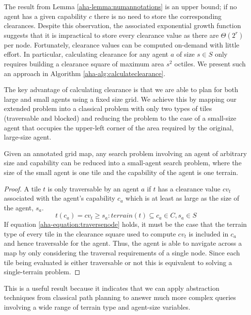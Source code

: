The result from Lemma \ref{aha-lemma:numannotations} is an upper bound; if no agent has a given capability $c$ there is no need to store the corresponding clearances.
Despite this observation, the associated exponential growth function suggests that it is impractical to store every clearance value as there are $\Theta(2^{r})$ per node.
Fortunately, clearance values can be computed on-demand with little effort. 
In particular, calculating clearance for any agent $a$ of size $s \in S$ only requires building a clearance square of maximum area $s^2$ octiles. 
We present such an approach in Algorithm \ref{aha-alg:calculateclearance}. 

\par \indent
The key advantage of calculating clearance is that we are able to plan for both large and small agents using a fixed size grid. 
We achieve this by mapping our extended problem into a classical problem with only two types of tiles (traversable and blocked) and reducing the problem to the case of a small-size agent that occupies the upper-left corner of the area required by the original, large-size agent. 
\begin{theorem}
\label{aha-theorem:reducibility}
Given an annotated grid map, any search problem involving an agent of arbitrary size and capability can be reduced into a small-agent search problem, where the size of the small agent is one tile and the capability of the agent is one terrain.
\end{theorem}

\begin{proof}
A tile $t$ is only traversable by an agent $a$ if $t$ has a clearance value $cv_{t}$ associated with the agent's capability $c_{a}$ which is at least as large as the size of the agent, $s_{a}$. 
\begin{equation}
\label{aha-equation:traversenode}
t(c_{a}) = cv_{t} \geq s_{a} : terrain(t) \subseteq c_{a} \in C, s_{a} \in S
\end{equation}
If equation \ref{aha-equation:traversenode} holds, it must be the case that the terrain type of every tile in the clearance square used to compute $cv_{t}$ is included in $c_{a}$ and hence traversable for the agent. 
Thus, the agent is able to navigate across a map by only considering the traversal requirements of a single node.
Since each tile being evaluated is either traversable or not this is equivalent to solving a single-terrain problem.
\end{proof}
This is a useful result because it indicates that we can apply abstraction techniques from classical path planning to answer much more complex queries involving a wide range of terrain type and agent-size variables.
